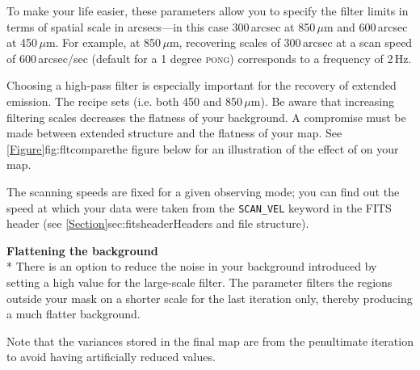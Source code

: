 \documentclass[11pt,oneside,chapters]{starlink}
\begin{document}
To make your life easier, these parameters allow you to specify the
filter limits in terms of spatial scale in arcsecs---in this case
300\,arcsec at 850\,$\mu$m and 600\,arcsec at 450\,$\mu$m. For example,
at 850\,$\mu$m, recovering scales of 300\,arcsec at a scan speed of
600\,arcsec/sec (default for a 1 degree \textsc{pong}) corresponds to
a frequency of 2\,Hz.

Choosing a high-pass filter is especially important for the recovery
of extended emission. The 
recipe sets  (i.e. both 450
and 850\,$\mu$m). Be aware that increasing filtering scales decreases
the flatness of your background. A compromise must be made between
extended structure and the flatness of your map. See
\cref{Figure}{fig:fltcompare}{the figure below} for an illustration of
the effect of  on your map.

The scanning speeds are fixed for a given observing mode; you can find
out the speed at which your data were taken from the
\texttt{SCAN\_VEL} keyword in the FITS header (see
\cref{Section}{sec:fitsheader}{Headers and file structure}).

\textbf{Flattening the background}\\*
There is an option to reduce the noise in your background introduced by
setting a high value for the large-scale filter. The parameter
 filters the regions outside
your  mask on a shorter scale for the last iteration only,
thereby producing a much flatter background.

Note that the variances stored in the final map are from the penultimate
iteration to avoid having artificially reduced values.
\end{document}
